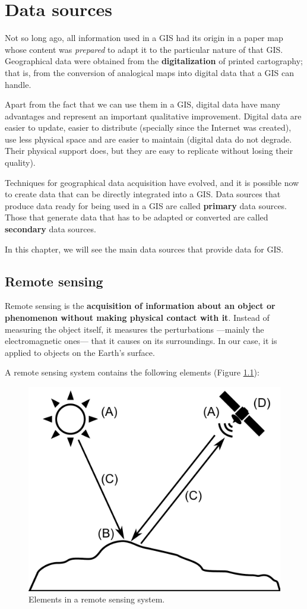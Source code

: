 
\chapter{Data sources}

\pagestyle{fancy}

Not so long ago, all information used in a GIS had its origin in a paper map whose content was \emph{prepared} to adapt it to the particular nature of that GIS. Geographical data were obtained from the \textbf{digitalization} of printed cartography; that is, from the conversion of analogical maps into digital data that a GIS can handle.

Apart from the fact that we can use them in a GIS, digital data have many advantages and represent an important qualitative improvement. Digital data are easier to update, easier to distribute (specially since the Internet was created), use less physical space and are easier to maintain (digital data do not degrade. Their physical support does, but they are easy to replicate without losing their quality).

Techniques for geographical data acquisition have evolved, and it is possible now to create data that can be directly integrated into a GIS. Data sources that produce data ready for being used in a GIS are called \textbf{primary} data sources. Those that generate data that has to be adapted or converted are called \textbf{secondary} data sources.

In this chapter, we will see the main data sources that provide data for GIS.

\section{Remote sensing}

Remote sensing is the \textbf{acquisition of information about an object or phenomenon without making physical contact with it}. Instead of measuring the object itself, it measures the perturbations ---mainly the electromagnetic ones--- that it causes on its surroundings. In our case, it is applied to objects on the Earth's surface.

A remote sensing system contains the following elements (Figure \ref{Fig:Elements_remote_sensing}):

\begin{figure}[!hbt]   
\centering
\includegraphics[width=.6\textwidth]{Data_sources/Elements_remote_sensing.pdf}
\caption{\small Elements in a remote sensing system.}
\label{Fig:Elements_remote_sensing} 
\end{figure}


